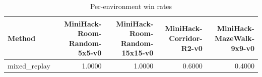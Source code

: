 \begin{table}[htbp]
\centering
\caption{Per-environment win rates}
\label{tab:per-env}
\begin{tabular}{lrrrr}
\toprule
\textbf{Method} & \textbf{MiniHack-Room-Random-5x5-v0} & \textbf{MiniHack-Room-Random-15x15-v0} & \textbf{MiniHack-Corridor-R2-v0} & \textbf{MiniHack-MazeWalk-9x9-v0} \\
\midrule
mixed\_replay & 1.0000 & 1.0000 & 0.6000 & 0.4000 \\
\bottomrule
\end{tabular}
\end{table}